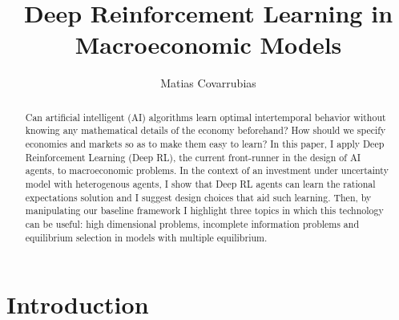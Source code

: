 \documentclass[11pt,english]{article}
\begin{document}
\title{Deep Reinforcement Learning in Macroeconomic Models}
\author{Matias Covarrubias}
\maketitle
\begin{abstract}
Can artificial intelligent (AI) algorithms learn optimal intertemporal behavior without knowing any mathematical details of the economy beforehand?  How should we specify economies and markets so as to make them easy to learn? In this paper, I apply Deep Reinforcement Learning (Deep RL), the current front-runner in the design of AI agents, to macroeconomic problems. In the context of an investment under uncertainty model with heterogenous agents, I show that Deep RL agents can learn the rational expectations solution and I suggest design choices that aid such learning. Then, by manipulating our baseline framework I highlight three topics in which this technology can be useful: high dimensional problems, incomplete information problems and equilibrium selection in models with multiple equilibrium.
\end{abstract}

\newpage 
\section{Introduction}
\end{document}
